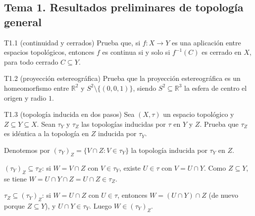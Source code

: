 \subsection{Tema 1. Resultados preliminares de topología general}

\begin{ejercicio}{T1.1 (continuidad y cerrados)}
Prueba que, si $f \colon X \to Y$ es una aplicación entre espacios topológicos, entonces $f$ es continua si y solo si $f^{-1}(C)$ es cerrado en $X$, para todo cerrado $C \subseteq Y$.

\end{ejercicio}

\begin{ejercicio}{T1.2 (proyección estereográfica)}
Prueba que la proyección estereográfica es un homeomorfismo entre $\mathbb{R}^2$ y $S^2 \setminus \{(0,0,1)\}$, siendo $S^2 \subseteq \mathbb{R}^3$ la esfera de centro el origen y radio $1$.

\end{ejercicio}

\begin{ejercicio}{T1.3 (topología inducida en dos pasos)}
Sea $(X,\tau)$ un espacio topológico y $Z \subseteq Y \subseteq X$. Sean $\tau_Y$ y $\tau_Z$ las topologías inducidas por $\tau$ en $Y$ y $Z$. Prueba que $\tau_Z$ es idéntica a la topología en $Z$ inducida por $\tau_Y$.

\sol \fuentepropia

Denotemos por $(\tau_Y)_Z = \{V \cap Z : V \in \tau_Y\}$ la topología inducida por $\tau_Y$ en $Z$.

$(\tau_Y)_Z \subseteq \tau_Z$: si $W = V \cap Z$ con $V \in \tau_Y$, existe $U \in \tau$ con $V = U \cap Y$. Como $Z \subseteq Y$, se tiene $W = U \cap Y \cap Z = U \cap Z \in \tau_Z$.

$\tau_Z \subseteq (\tau_Y)_Z$: si $W = U \cap Z$ con $U \in \tau$, entonces $W = (U \cap Y) \cap Z$ (de nuevo porque $Z \subseteq Y$), y $U \cap Y \in \tau_Y$. Luego $W \in (\tau_Y)_Z$.
\end{ejercicio}

